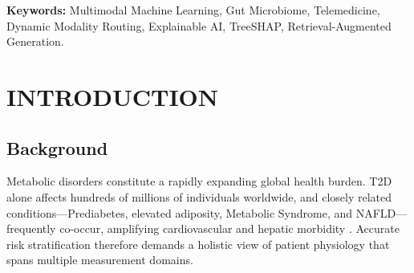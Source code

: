 \documentclass[10pt,twocolumn,letterpaper]{article}
\begin{document}
\begin{abstract}
Cardiometabolic diseases---Type~2 Diabetes (T2D), Prediabetes, High Adiposity Risk, Metabolic Syndrome, and Non-Alcoholic Fatty Liver Disease (NAFLD)---arise from complex interactions among clinical biomarkers, continuous behavioral patterns, and intestinal microbial ecology. While contemporary telehealth platforms capture laboratory results and wearable signals, gut microbiome data and robust strategies for handling incomplete modality coverage remain scarce. We present \textbf{TeleMed-M3}, a modular multimodal learning framework for individualized metabolic risk stratification without numerical reconstruction of missing modalities. The architecture deploys fifteen modality-specific expert classifiers across Clinical (18 features), Wearable/CGM (15 features), and Gut Microbiome (49 features) blocks, then fuses their probability outputs through an L2-regularized logistic regression meta-learner trained on five-fold stratified out-of-fold predictions. A deterministic routing layer directs each patient through one of seven non-empty modality pathways ($2^{3}-1$ subsets), avoiding artificial imputation of unobserved channels. On a 100{,}000-record synthetic cohort, the complete trimodal (C+W+G) pathway achieved AUROCs of 0.7834 (T2D), 0.7586 (Metabolic Syndrome), and 0.7772 (NAFLD). Under 30\% simulated modality missingness, dynamic routing sustained a T2D AUROC of 0.7743, outperforming median imputation by 0.0021. TreeSHAP furnishes per-prediction feature attributions, while an exploratory Medical RAG module grounds summaries in clinical guidelines. All findings derive from synthetic data; clinical validation on human cohorts remains a prerequisite for deployment.
\end{abstract}

\vspace{0.3em}
\noindent\textbf{Keywords:} Multimodal Machine Learning, Gut Microbiome, Telemedicine, Dynamic Modality Routing, Explainable AI, TreeSHAP, Retrieval-Augmented Generation.

\section{INTRODUCTION}

\subsection{Background}
Metabolic disorders constitute a rapidly expanding global health burden. T2D alone affects hundreds of millions of individuals worldwide, and closely related conditions---Prediabetes, elevated adiposity, Metabolic Syndrome, and NAFLD---frequently co-occur, amplifying cardiovascular and hepatic morbidity \citep{topol2019high, ada2024standards, alberti2009harmonizing, rinella2023aasld}. Accurate risk stratification therefore demands a holistic view of patient physiology that spans multiple measurement domains.
\end{document}
